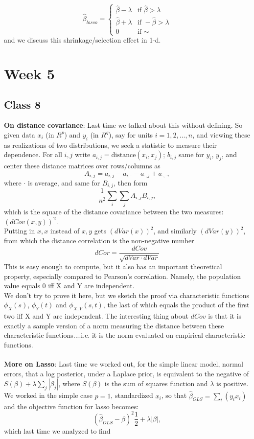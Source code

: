 \documentclass[11pt,a4paper]{article}
\begin{document}
\[
 \hat{\beta}_{lasso} =
  \begin{cases}
   \hat{\beta}-\lambda & \text{if } \hat{\beta}>\lambda \\
   \hat{\beta}+\lambda       & \text{if } -\hat{\beta}>\lambda \\
   0 & \text{if } \sim
  \end{cases}
\]
and we discuss this shrinkage/selection effect in 1-d.

\section*{Week 5}

\subsection*{Class 8}

\textbf{On distance covariance}:  Last time we talked about this without defining.  So given data $x_i$  (in $R^p$) and $y_i$ (in $R^q$), say for units $i=1,2,\ldots,n$, and viewing these as realizations of two distributions, we seek a statistic to measure their dependence. For all $i,j$ write $a_{i,j} = \text{distance}(x_i, x_j)$;  $b_{i,j}$ same for $y_i$, $y_j$, and center these distance matrices over rows/columns as
$$A_{i,j} = a_{i,j} - a_{i,\cdot} - a_{\cdot,j} + a_{\cdot ,\cdot} ,$$ where $\cdot$ is average, and same for $B_{i,j}$, then form
$$\frac{1}{n^2} \sum_{i} \sum_{j}  A_{i,j} B_{i,j},$$ which is the square of the distance covariance between the two measures: $(dCov(x,y))^2$.\\
Putting in $x,x$ instead of $x,y$ gets $(dVar(x))^2$, and similarly $(dVar(y))^2$, from which the distance correlation is the non-negative number
$$dCor = \frac{dCov}{\sqrt{ dVar\cdot dVar}}$$
This is easy enough to compute, but it also has an important theoretical property, especially compared to Pearson's correlation. Namely, the population value equals 0 iff X and Y are independent.\\
We don't try to prove it here, but we sketch the proof via characteristic functions $\phi_X(s)$, $\phi_Y(t)$ and $\phi_{X,Y}(s,t)$, the last of which equals the product of the first two iff X and Y are independent. The interesting thing about $dCov$ is that it is exactly a sample version of a norm measuring the distance between these characteristic functions....i.e. it is the norm evaluated on empirical characteristic functions. \\\\
\textbf{More on Lasso}: Last time we worked out, for the simple linear model, normal errors, that a log posterior, under a Laplace prior, is equivalent to the negative of  $S(\beta) + \lambda \sum_j |\beta_j|$, where $S(\beta)$ is the sum of squares function and $\lambda$ is positive.  We worked in the simple case $p=1$, standardized $x_{i}$, so that $\hat{\beta}_{OLS} = \sum_i (y_i x_i)$ and the objective function for lasso becomes:    $$(\hat{\beta}_{OLS} - \beta)^2 \frac{1}{2} + \lambda | \beta |,$$ which last time we analyzed to find
\end{document}

